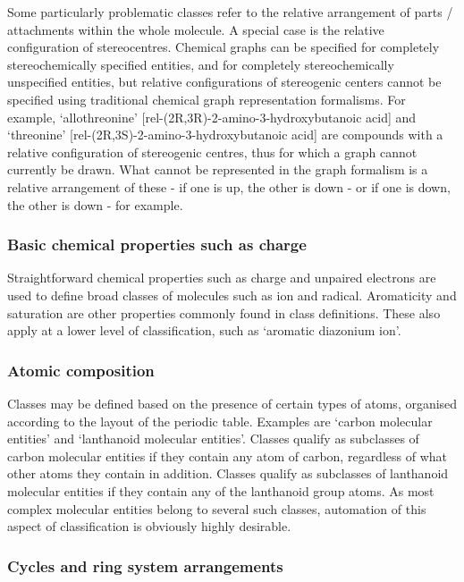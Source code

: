 \documentclass[10pt]{bmc_article}
\newenvironment{bmcformat}{\baselineskip20pt\sloppy\setboolean{publ}{false}}{\baselineskip20pt\sloppy}
\begin{document}
\begin{bmcformat}
Some particularly problematic classes refer to the relative arrangement of parts / attachments within the whole molecule. A special case is the relative configuration of stereocentres. Chemical graphs can be specified for completely stereochemically specified entities, and for completely stereochemically unspecified entities, but relative configurations of stereogenic centers cannot be specified using traditional chemical graph representation formalisms. For example, `allothreonine' [rel-(2R,3R)-2-amino-3-hydroxybutanoic acid] and `threonine' [rel-(2R,3S)-2-amino-3-hydroxybutanoic acid] are compounds with a relative configuration of stereogenic centres, thus for which a graph cannot currently be drawn. What cannot be represented in the graph formalism is a relative arrangement of these - if one is up, the other is down - or if one is down, the other is down - for example. 


\subsubsection*{Basic chemical properties such as charge}

Straightforward chemical properties such as charge and unpaired electrons are used to define broad classes of molecules such as ion and radical. Aromaticity and saturation are other properties commonly found in class definitions. These also apply at a lower level of classification, such as `aromatic diazonium ion'.  


\subsubsection*{Atomic composition}

Classes may be defined based on the presence of certain types of atoms, organised according to the layout of the periodic table.  Examples are `carbon molecular entities' and `lanthanoid molecular entities'. Classes qualify as subclasses of carbon molecular entities if they contain any atom of carbon, regardless of what other atoms they contain in addition.  Classes qualify as subclasses of lanthanoid molecular entities if they contain any of the lanthanoid group atoms.  As most complex molecular entities belong to several such classes, automation of this aspect of classification is obviously highly desirable. 


\subsubsection*{Cycles and ring system arrangements}


\end{bmcformat}
\end{document}
